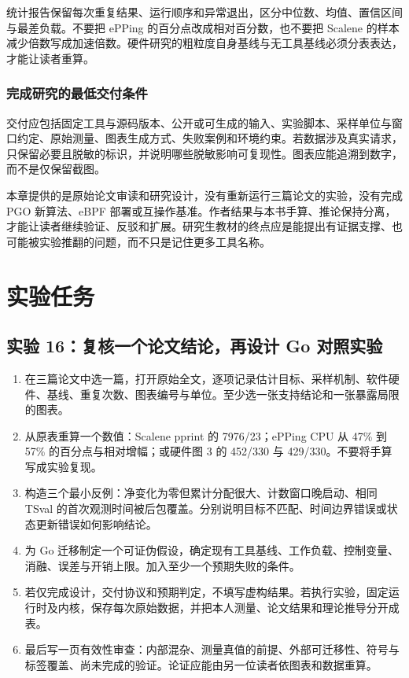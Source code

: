 \documentclass[UTF8,fontset=fandol,openany,11pt]{ctexbook}
\begin{document}
统计报告保留每次重复结果、运行顺序和异常退出，区分中位数、均值、置信区间与最差负载。不要把 ePPing 的百分点改成相对百分数，也不要把 Scalene 的样本减少倍数写成加速倍数。硬件研究的粗粒度自身基线与无工具基线必须分表表达，才能让读者重算。

\subsubsection{完成研究的最低交付条件}
交付应包括固定工具与源码版本、公开或可生成的输入、实验脚本、采样单位与窗口约定、原始测量、图表生成方式、失败案例和环境约束。若数据涉及真实请求，只保留必要且脱敏的标识，并说明哪些脱敏影响可复现性。图表应能追溯到数字，而不是仅保留截图。

本章提供的是原始论文审读和研究设计，没有重新运行三篇论文的实验，没有完成 PGO 新算法、eBPF 部署或互操作基准。作者结果与本书手算、推论保持分离，才能让读者继续验证、反驳和扩展。研究生教材的终点应是能提出有证据支撑、也可能被实验推翻的问题，而不只是记住更多工具名称。

\section{实验任务}
\subsection*{实验 16：复核一个论文结论，再设计 Go 对照实验}
\begin{enumerate}
\item 在三篇论文中选一篇，打开原始全文，逐项记录估计目标、采样机制、软件硬件、基线、重复次数、图表编号与单位。至少选一张支持结论和一张暴露局限的图表。

\item 从原表重算一个数值：Scalene pprint 的 7976/23；ePPing CPU 从 47\% 到 57\% 的百分点与相对增幅；或硬件图 3 的 452/330 与 429/330。不要将手算写成实验复现。

\item 构造三个最小反例：净变化为零但累计分配很大、计数窗口晚启动、相同 TSval 的首次观测时间被后包覆盖。分别说明目标不匹配、时间边界错误或状态更新错误如何影响结论。

\item 为 Go 迁移制定一个可证伪假设，确定现有工具基线、工作负载、控制变量、消融、误差与开销上限。加入至少一个预期失败的条件。

\item 若仅完成设计，交付协议和预期判定，不填写虚构结果。若执行实验，固定运行时及内核，保存每次原始数据，并把本人测量、论文结果和理论推导分开成表。

\item 最后写一页有效性审查：内部混杂、测量真值的前提、外部可迁移性、符号与标签覆盖、尚未完成的验证。论证应能由另一位读者依图表和数据重算。

\end{enumerate}
\end{document}
